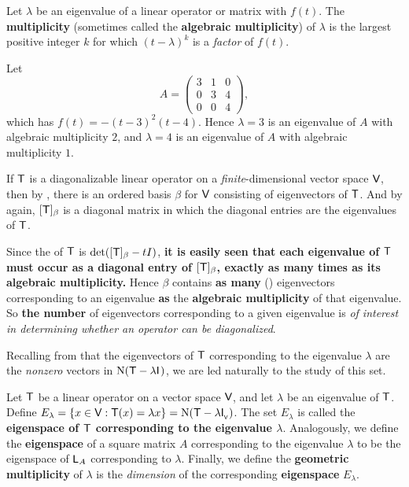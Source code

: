\begin{definition} \label{def 5.6}
Let \(\lambda\) be an eigenvalue of a linear operator or matrix with \CPOLY{} \(f(t)\).
The \textbf{multiplicity} (sometimes called the \textbf{algebraic multiplicity}) of \(\lambda\) is the largest positive integer \(k\) for which \((t - \lambda)^k\) is a \emph{factor} of \(f(t)\).
\end{definition}

\begin{example} \label{example 5.2.2}
Let
\[
    A = \begin{pmatrix} 3 & 1 & 0 \\ 0 & 3 & 4 \\ 0 & 0 & 4 \end{pmatrix},
\]
which has \CPOLY{} \(f(t) = -(t - 3)^2(t - 4)\).
Hence \(\lambda = 3\) is an eigenvalue of \(A\) with algebraic multiplicity \(2\), and \(\lambda = 4\) is an eigenvalue of \(A\) with algebraic multiplicity \(1\).
\end{example}

\begin{remark} \label{remark 5.2.4}
If \(\textsf{T}\) is a diagonalizable linear operator on a \emph{finite}-dimensional vector space \(\textsf{V}\), then by , there is an ordered basis \(\beta\) for \(\textsf{V}\) consisting of eigenvectors of \(\textsf{T}\).
And by  again, \([\textsf{T}]_{\beta}\) is a diagonal matrix in which the diagonal entries are the eigenvalues of \(\textsf{T}\).

Since the \CPOLY{} of \(\textsf{T}\) is \(\det([\textsf{T}]_{\beta} - tI)\), \textbf{it is easily seen that each eigenvalue of \(\textsf{T}\) must occur as a diagonal entry of \([\textsf{T}]_{\beta}\), exactly as many times as its algebraic multiplicity.}
Hence \(\beta\) contains \textbf{as many} (\LID{}) eigenvectors corresponding to an eigenvalue \textbf{as} the \textbf{algebraic multiplicity} of that eigenvalue.
So \textbf{the number} of \LID{} eigenvectors corresponding to a given eigenvalue is \emph{of interest in determining whether an operator can be diagonalized}.

Recalling from  that the eigenvectors of \(\textsf{T}\) corresponding to the eigenvalue \(\lambda\) are the \emph{nonzero} vectors in \(\mathrm{N}(\textsf{T} - \lambda \textsf{I}_{_{}})\), we are led naturally to the study of this set.
\end{remark}

\begin{definition} \label{def 5.7}
Let \(\textsf{T}\) be a linear operator on a vector space \(\textsf{V}\), and let \(\lambda\) be an eigenvalue of \(\textsf{T}\).
Define \(E_{\lambda} = \{x \in \textsf{V} : \textsf{T}(x) = \lambda x \} = \mathrm{N}(\textsf{T} - \lambda \textsf{I}_{_{\textsf{V}}}{})\).
The set \(E_{\lambda}\) is called the \textbf{eigenspace of \(\textsf{T}\) corresponding to the eigenvalue \(\lambda\)}.
Analogously, we define the \textbf{eigenspace} of a square matrix \(A\) corresponding to the eigenvalue \(\lambda\) to be the eigenspace of \(\textsf{L}_A\) corresponding to \(\lambda\).
Finally, we define the \textbf{geometric multiplicity} of \(\lambda\) is the \emph{dimension} of the corresponding \textbf{eigenspace} \(E_{\lambda}\).
\end{definition}


